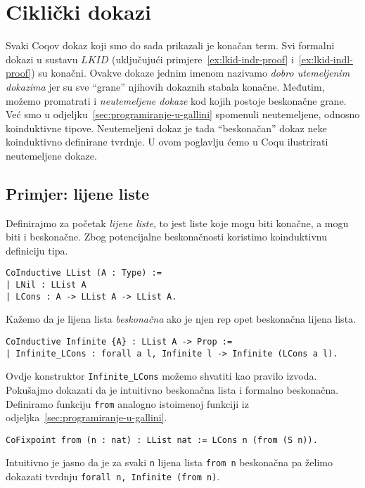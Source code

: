 \chapter{Ciklički dokazi}\label{cha:cikliki-dokazi}
Svaki Coqov dokaz koji smo do sada prikazali je konačan term.
Svi formalni dokazi u sustavu \(\mathit{LKID}\) (uključujući primjere~\ref{ex:lkid-indr-proof} i~\ref{ex:lkid-indl-proof}) su konačni.
Ovakve dokaze jednim imenom nazivamo \textit{dobro utemeljenim dokazima} jer su sve \enquote{grane} njihovih dokaznih stabala konačne.
Međutim, možemo promatrati i \textit{neutemeljene dokaze} kod kojih postoje beskonačne grane.
Već smo u odjeljku~\ref{sec:programiranje-u-gallini} spomenuli neutemeljene, odnosno koinduktivne tipove.
Neutemeljeni dokaz je tada \enquote{beskonačan} dokaz neke koinduktivno definirane tvrdnje.
U ovom poglavlju ćemo u Coqu ilustrirati neutemeljene dokaze.

\section{Primjer: lijene liste}
Definirajmo za početak \textit{lijene liste}, to jest liste koje mogu biti konačne, a mogu biti i beskonačne.
Zbog potencijalne beskonačnosti koristimo koinduktivnu definiciju tipa.
\begin{verbatim}
CoInductive LList (A : Type) :=
| LNil : LList A
| LCons : A -> LList A -> LList A.
\end{verbatim}
\noindent Kažemo da je lijena lista \textit{beskonačna} ako je njen rep opet beskonačna lijena lista.
\begin{verbatim}
CoInductive Infinite {A} : LList A -> Prop :=
| Infinite_LCons : forall a l, Infinite l -> Infinite (LCons a l).
\end{verbatim}
\noindent Ovdje konstruktor \texttt{Infinite\_LCons} možemo shvatiti kao pravilo izvoda.
Pokušajmo dokazati da je intuitivno beskonačna lista i formalno beskonačna.
Definiramo funkciju \texttt{from} analogno istoimenoj funkciji iz odjeljka~\ref{sec:programiranje-u-gallini}.
\begin{verbatim}
CoFixpoint from (n : nat) : LList nat := LCons n (from (S n)).
\end{verbatim}
\noindent Intuitivno je jasno da je za svaki \texttt{n} lijena lista \texttt{from n}
beskonačna pa želimo dokazati tvrdnju \texttt{forall n, Infinite (from n)}.

